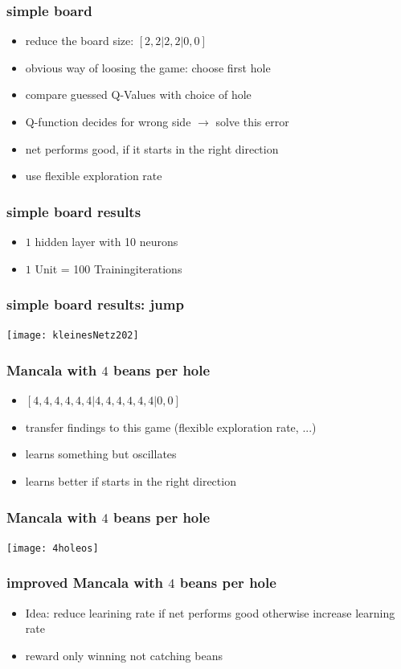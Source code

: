 \documentclass{beamer}
\begin{document}
 \begin{frame}
 \frametitle{simple board}
 \begin{itemize}
\item reduce the board size: $[2,2|2,2|0,0]$
\item obvious way of loosing the game: choose first hole
\item compare guessed Q-Values with choice of hole
\item Q-function decides for wrong side $\rightarrow$ solve this error
\item net performs good, if it starts in the right direction
\item use flexible exploration rate
\end{itemize}
 \end{frame}

 \begin{frame}
 \frametitle{simple board results}
\begin{itemize}
\item $1$ hidden layer with 10 neurons
\item $1$ Unit = 100 Trainingiterations
\end{itemize}
 \end{frame}

 \begin{frame}
 \frametitle{simple board results: jump}
 \texttt{[image: kleinesNetz202]}
 \end{frame}

 \begin{frame}
 \frametitle{Mancala with $4$ beans per hole}
 \begin{itemize}
\item  $[4,4,4,4,4,4|4,4,4,4,4,4|0,0]$
\item transfer findings to this game (flexible exploration rate, ...)
\item learns something but oscillates 
\item  learns better if starts in the right direction
\end{itemize}
 \end{frame}

 \begin{frame}
 \frametitle{Mancala with $4$ beans per hole}
 \texttt{[image: 4holeos]}
 \end{frame}

\begin{frame}
\frametitle{improved Mancala with $4$ beans per hole}
\begin{itemize}
\item Idea: reduce learining rate if net performs good otherwise increase learning rate
\item reward only winning not catching beans
\end{itemize}
\end{frame}
\end{document}
